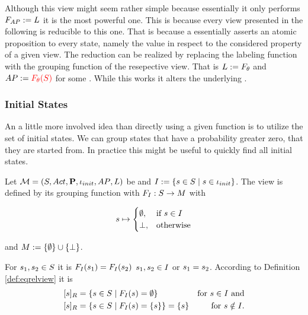 \documentclass[preview]{standalone}
\begin{document}
Although this view might seem rather simple because essentially it only performs ${{F_{{AP}}}} := {L}$ it is the most powerful one. This is because every view presented in the following is reducible to this one. That is because a \grpfctN essentially asserts an atomic proposition to every state, namely the value in respect to the considered property of a given view. The reduction can be realized by replacing the labeling function with the grouping function of the resepective view. That is ${L} := {F_{{\theta}}}$ and ${AP} := {\color{red}{F_{\ensuremath{{\theta}}}}({S})}$ for some \grpfctN \grpfct. While this works it alters the underlying \chgphN.

\subsubsection{Initial States}
An a little more involved idea than directly using a given function is to utilize the set of initial states. We can group states that have a probability greater zero, that they are started from. In practice this might be useful to quickly find all initial states.

\begin{definition}
	Let ${{{\mathcal{M}}}} = {{({S}, {Act}, {\textbf{P}}, {\iota_{init}}, {AP}, {L})}}$ be \achgphN and ${I} := \{{s} \in {S} \mid {s} \in {\ensuremath{{\iota_{init}}}}\}$. The view \viewinitstates is defined by its grouping function \gfctinitstates \grpfctN with ${{F_{{I}}}} : {S} \to {\ensuremath{{M}}}$ with 
	
	\[
	{s} \mapsto
	\begin{cases}
		\emptyset,				& \text{if } {s} \in {I} \\
		{\bot},          	& \text{otherwise}
	\end{cases}
	\]
	
	and ${{M}} := \{\emptyset\} \cup {\{\bot\}}$.
\end{definition}

For ${s}_1,{s}_2 \in {S}$ it is ${{F_{{I}}}}({s}_1) = {{F_{{I}}}}({s}_2)$ \iffN ${s}_1, {s}_2 \in {I}$ or ${s}_1 = {s}_2$. According to Definition \ref{def:eqrelview} it is 
\begin{align*}
	{\ensuremath{{[{s}]_{{R}}}}} &= \{{s} \in {S} \mid {\ensuremath{{F_{{I}}}}}({s}) = \emptyset\} &\text{for } {s} \in {I} \text{ and} \\
	{{[{s}]_{{R}}}} &= \{{s} \in {S} \mid {\ensuremath{{F_{{I}}}}}({s}) = \{{s}\} \} = \{{s}\} &\text{for } {s} \notin {I}.
\end{align*}
\end{document}

